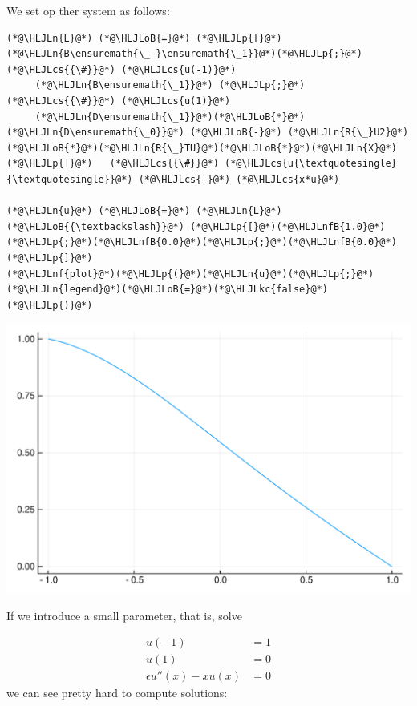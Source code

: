 \documentclass[12pt,a4paper]{article}
\newcommand{\HLJLkc}[1]{\textcolor[RGB]{59,151,46}{\textit{#1}}}
\newcommand{\HLJLn}[1]{#1}
\newcommand{\HLJLnf}[1]{\textcolor[RGB]{66,102,213}{#1}}
\newcommand{\HLJLnfB}[1]{\textcolor[RGB]{59,151,46}{#1}}
\newcommand{\HLJLoB}[1]{\textcolor[RGB]{102,102,102}{\textbf{#1}}}
\newcommand{\HLJLp}[1]{#1}
\newcommand{\HLJLcs}[1]{\textcolor[RGB]{153,153,119}{\textit{#1}}}
\begin{document}
We set op ther system as follows:


\begin{lstlisting}
(*@\HLJLn{L}@*) (*@\HLJLoB{=}@*) (*@\HLJLp{[}@*)(*@\HLJLn{B\ensuremath{\_-}\ensuremath{\_1}}@*)(*@\HLJLp{;}@*)   (*@\HLJLcs{{\#}}@*) (*@\HLJLcs{u(-1)}@*)
     (*@\HLJLn{B\ensuremath{\_1}}@*) (*@\HLJLp{;}@*)   (*@\HLJLcs{{\#}}@*) (*@\HLJLcs{u(1)}@*)
     (*@\HLJLn{D\ensuremath{\_1}}@*)(*@\HLJLoB{*}@*)(*@\HLJLn{D\ensuremath{\_0}}@*) (*@\HLJLoB{-}@*) (*@\HLJLn{R{\_}U2}@*)(*@\HLJLoB{*}@*)(*@\HLJLn{R{\_}TU}@*)(*@\HLJLoB{*}@*)(*@\HLJLn{X}@*)(*@\HLJLp{]}@*)   (*@\HLJLcs{{\#}}@*) (*@\HLJLcs{u{\textquotesingle}{\textquotesingle}}@*) (*@\HLJLcs{-}@*) (*@\HLJLcs{x*u}@*)

(*@\HLJLn{u}@*) (*@\HLJLoB{=}@*) (*@\HLJLn{L}@*) (*@\HLJLoB{{\textbackslash}}@*) (*@\HLJLp{[}@*)(*@\HLJLnfB{1.0}@*)(*@\HLJLp{;}@*)(*@\HLJLnfB{0.0}@*)(*@\HLJLp{;}@*)(*@\HLJLnfB{0.0}@*)(*@\HLJLp{]}@*)
(*@\HLJLnf{plot}@*)(*@\HLJLp{(}@*)(*@\HLJLn{u}@*)(*@\HLJLp{;}@*) (*@\HLJLn{legend}@*)(*@\HLJLoB{=}@*)(*@\HLJLkc{false}@*)(*@\HLJLp{)}@*)
\end{lstlisting}

\includegraphics[width=\linewidth]{figures/Lecture22_16_1.pdf}

If we introduce a small parameter, that is, solve


\begin{align*}
u(-1) &= 1\\
u(1) &= 0\\
\epsilon u''(x) - xu(x) &= 0
\end{align*}
we can see pretty hard to compute solutions:
\end{document}
